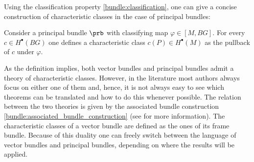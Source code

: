     Using the classification property \ref{bundle:classification}, one can give a concise construction of characteristic classes in the case of principal bundles:
    \begin{construct}
        Consider a principal bundle $\prb$ with classifying map $\varphi\in[M,BG]$. For every $c\in H^\bullet(BG)$ one defines a characteristic class $c(P)\in H^\bullet(M)$ as the pullback of $c$ under $\varphi$.
    \end{construct}

    As the definition implies, both vector bundles and principal bundles admit a theory of characteristic classes. However, in the literature most authors always focus on either one of them and, hence, it is not always easy to see which theorems can be translated and how to do this whenever possible. The relation between the two theories is given by the associated bundle construction \ref{bundle:associated_bundle_construction} (see \cite{sorensen} for more information). The characteristic classes of a vector bundle are defined as the ones of its frame bundle. Because of this duality one can freely switch between the language of vector bundles and principal bundles, depending on where the results will be applied.

